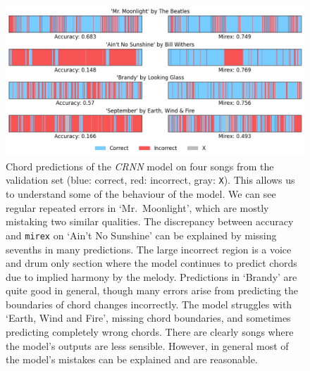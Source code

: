 \begin{figure}[H]
    \centering
    \includegraphics[width=1.0\textwidth]{figures/chord_recognition_examples.png}
    \caption{Chord predictions of the \emph{CRNN} model on four songs from the validation set (blue: correct, red: incorrect, gray: \texttt{X}). This allows us to understand some of the behaviour of the model. We can see regular repeated errors in `Mr.\ Moonlight', which are mostly mistaking two similar qualities. The discrepancy between accuracy and \texttt{mirex} on `Ain't No Sunshine' can be explained by missing sevenths in many predictions. The large incorrect region is a voice and drum only section where the model continues to predict chords due to implied harmony by the melody. Predictions in `Brandy' are quite good in general, though many errors arise from predicting the boundaries of chord changes incorrectly. The model struggles with `Earth,  Wind and Fire', missing chord boundaries, and sometimes predicting completely wrong chords. There are clearly songs where the model's outputs are less sensible. However, in general most of the model's mistakes can be explained and are reasonable.}\label{fig:crnn_examples}
\end{figure}

